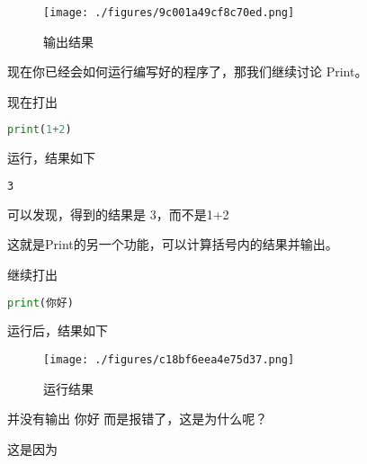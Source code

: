 \begin{figure}[ht]
\centering
\texttt{[image: ./figures/9c001a49cf8c70ed.png]}
\caption{输出结果} \label{fig_Pyc2_6}
\end{figure}

现在你已经会如何运行编写好的程序了，那我们继续讨论 Print。

现在打出

\begin{lstlisting}[language=python]
print(1+2)
\end{lstlisting}

运行，结果如下

\begin{lstlisting}[language=bash]
3
\end{lstlisting}

可以发现，得到的结果是 3，而不是1+2

这就是Print的另一个功能，可以计算括号内的结果并输出。

继续打出

\begin{lstlisting}[language=python]
print(你好)
\end{lstlisting}

运行后，结果如下

\begin{figure}[ht]
\centering
\texttt{[image: ./figures/c18bf6eea4e75d37.png]}
\caption{运行结果} \label{fig_Pyc2_7}
\end{figure}

并没有输出 你好 而是报错了，这是为什么呢？

这是因为

